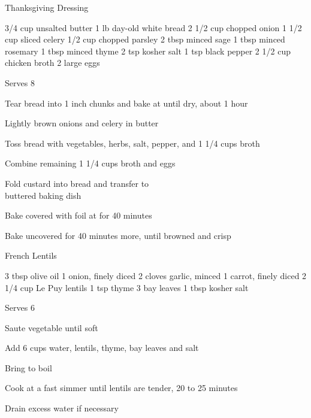 \begin{denserecipe}{Thanksgiving Dressing}{}
\begin{ingredients}
3/4 cup unsalted butter
1 lb day-old white bread
2 1/2 cup chopped onion
1 1/2 cup sliced celery
1/2 cup chopped parsley
2 tbsp minced sage
1 tbsp minced rosemary
1 tbsp minced thyme
2 tsp kosher salt
1 tsp black pepper
2 1/2 cup chicken broth
2 large eggs
\end{ingredients}
\nextcolumn
Serves 8
\begin{steps}
    \item Tear bread into 1 inch chunks and bake at  until dry, about 1 hour
    \item Lightly brown onions and celery in butter
    \item Toss bread with vegetables, herbs, salt, pepper, and 1 1/4 cups broth
    \item Combine remaining 1 1/4 cups broth and eggs
    \item Fold custard into bread and transfer to \\buttered baking dish
    \item Bake covered with foil at  for 40 minutes
    \item Bake uncovered for 40 minutes more, until browned and crisp
\end{steps}
\end{denserecipe}

\begin{recipe}{French Lentils}{\vegetarian{}}
\begin{ingredients}
3 tbsp olive oil
1 onion, finely diced
2 cloves garlic, minced
1 carrot, finely diced
2 1/4 cup Le Puy lentils
1 tsp thyme
3 bay leaves
1 tbsp kosher salt
\end{ingredients}
\nextcolumn
Serves 6
\begin{steps}
    \item Saute vegetable until soft
    \item Add 6 cups water, lentils, thyme, bay leaves and salt
    \item Bring to boil
    \item Cook at a fast simmer until lentils are tender, 20 to 25 minutes
    \item Drain excess water if necessary
\end{steps}
\end{recipe}

